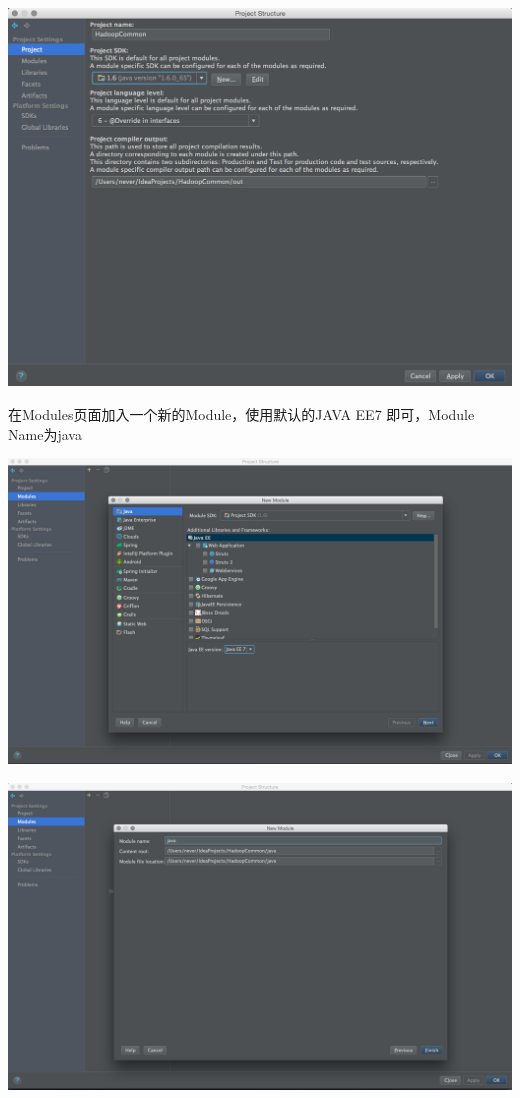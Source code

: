 \includegraphics[width=\textwidth]{image/env/cr23.png}

在Modules页面加入一个新的Module，使用默认的JAVA EE7 即可，Module Name为java

\includegraphics[width=\textwidth]{image/env/cr24.png}

\includegraphics[width=\textwidth]{image/env/cr25.png}

